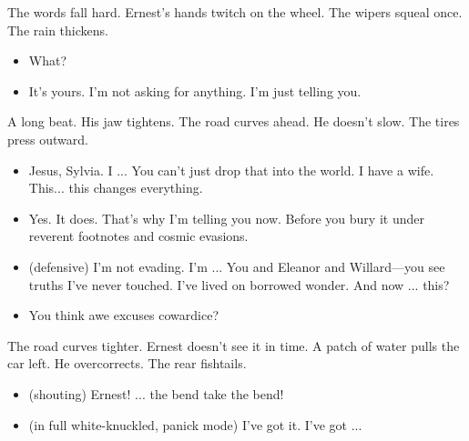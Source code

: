 The words fall hard. Ernest’s hands twitch on the wheel. The wipers squeal once. The rain thickens.
\begin{itemize}[leftmargin=2cm, label={}]

\item[\textbf{Ernest:}]  
What?

\item[\textbf{Sylvia:}]  
It’s yours. I’m not asking for anything. I’m just telling you.
\end{itemize}

A long beat. His jaw tightens. The road curves ahead. He doesn’t slow. The tires press outward.

\begin{itemize}[leftmargin=2cm, label={}]


\item[\textbf{Ernest:}]  
Jesus, Sylvia. I ... 
You can’t just drop that into the world. I have a wife. This... this changes everything.


\item[\textbf{Sylvia:}]  
Yes. It does. That’s why I’m telling you now. Before you bury it under reverent footnotes and cosmic evasions.

\item[\textbf{Ernest :}]  (defensive)
I’m not evading. I’m ...  
You and Eleanor and Willard—you see truths I’ve never touched. I’ve lived on borrowed wonder. And now ... this?

\item[\textbf{Sylvia:}]  
You think awe excuses cowardice?
\end{itemize}

The road curves tighter. Ernest doesn’t see it in time. A patch of water pulls the car left. He overcorrects. The rear fishtails.

\begin{itemize}[leftmargin=2cm, label={}]

\item[\textbf{Sylvia :}] (shouting) 
Ernest! ... the bend take the bend!
\end{itemize}

\begin{itemize}[leftmargin=2cm, label={}]

\item[\textbf{Ernest :}] (in full white-knuckled, panick mode) 
I’ve got it. I’ve got ...

\end{itemize}

